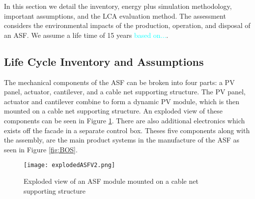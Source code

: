 
In this section we detail the inventory, energy plus simulation methodology, important assumptions, and the LCA evaluation method. The assessment considers the environmental impacts of the production, operation, and disposal of an ASF. We assume a life time of 15 years \textcolor{cyan}{based on...}.
\\

\subsection{Life Cycle Inventory and Assumptions}

The mechanical components of the ASF can be broken into four parts: a PV panel, actuator, cantilever, and a cable net supporting structure. The PV panel, actuator and cantilever combine to form a dynamic PV module, which is then mounted on a cable net supporting structure. An exploded view of these components can be seen in Figure \ref{fig:explodedView}. There are also additional electronics which exists off the facade in a separate control box. Theses five components along with the assembly, are the main product systems in the manufacture of the ASF as seen in Figure \ref{fig:BOS}. 



\begin{figure}[H]
\begin{center}
\texttt{[image: explodedASFV2.png]}
\caption{Exploded view of an ASF module mounted on a cable net supporting structure}
\label{fig:explodedView}
\end{center}
\end{figure}

